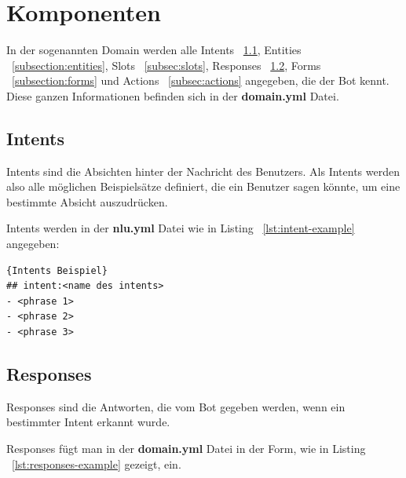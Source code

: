 \section{Komponenten}\label{sec:components}

In der sogenannten Domain werden alle Intents ~\ref{subsec:Intents}, Entities ~\ref{subsection:entities}, Slots ~\ref{subsec:slots}, Responses ~\ref{subsec:Responses}, Forms ~\ref{subsection:forms} und Actions ~\ref{subsec:actions} angegeben, die der Bot kennt.
Diese ganzen Informationen befinden sich in der \textbf{domain.yml} Datei.\cite{domain}

\subsection{Intents}\label{subsec:Intents}

Intents sind die Absichten hinter der Nachricht des Benutzers.
Als Intents werden also alle möglichen Beispielsätze definiert, die ein Benutzer sagen könnte, um eine bestimmte Absicht auszudrücken.\cite{intents}

Intents werden in der \textbf{nlu.yml} Datei wie in Listing ~\ref{lst:intent-example} angegeben:

\begin{lstlisting}[label={lst:intent-example},caption={Intents Beispiel}]{Intents Beispiel}
## intent:<name des intents>
- <phrase 1>
- <phrase 2>
- <phrase 3>
\end{lstlisting}

\subsection{Responses}\label{subsec:Responses}

Responses sind die Antworten, die vom Bot gegeben werden, wenn ein bestimmter Intent erkannt wurde.\cite{responses}

Responses fügt man in der \textbf{domain.yml} Datei in der Form, wie in Listing ~\ref{lst:responses-example} gezeigt, ein.

